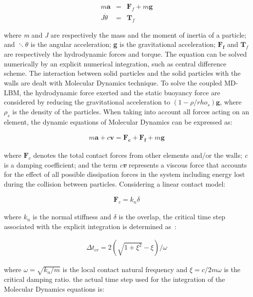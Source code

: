 \begin{align}
\mathit{m}\mathbf{ a} & = & \mathbf{F}_{f} + \mathit{m }\mathbf{g} \\
\mathit{J } \ddot{\theta} & = &  \mathbf{T}_{f}
\end{align}

where \textit{m} and \textit{J} are respectively the mass and the moment of 
inertia of a particle; and $\ddots{\theta}$ is the angular acceleration; 
\textbf{g} is the gravitational acceleration; $\mathbf{F_f}$ and 
$\mathbf{T}_{f}$ are respectively the hydrodynamic forces and torque. The 
equation can be solved numerically by an explicit numerical integration, such 
as central difference scheme. The interaction between solid particles and the 
solid particles with the walls are dealt with Molecular Dynamics technique. To 
solve the coupled MD-LBM, the hydrodynamic force exerted and the static 
buoyancy force are considered by reducing the gravitational acceleration to 
$(1- \rho/rho_{s})\mathbf{g}$, where $\rho_{s}$ is the density of the 
particles. When taking into account all forces acting on an element, the 
dynamic equations of Molecular Dynamics can be expressed as:

\begin{align}
\label{eq:mde}
\mathit{m}\mathbf{a} +\mathit{c}\mathbf{v} = \mathbf{F_c} + \mathbf{F_f} 
+\mathit{m}\mathbf{g}
\end{align} 

where $\mathbf{F}_{c}$ denotes the total contact forces from other elements 
and/or the walls; \textit{c} is a damping coefficient; and the term 
\textit{c\textbf{v}} represents a viscous force that accounts for the effect of 
all possible dissipation forces in the system including energy lost during the 
collision between particles. Considering a linear contact model:

\begin{align}
\mathbf{F}_{c}=\mathit{k}_{\mathit{n}} \delta
\end{align}

where $\mathit{k}_{\mathit{n}}$ is the normal stiffness and $\delta$ is the 
overlap, the critical time step associated with the explicit integration is 
determined as~\citep{He1997}:

\begin{align}
\Delta t_{\mathit{cr}}= 2(\sqrt{1 + \xi^{2}}-\xi) / \omega
\end{align}

where $\omega = \sqrt{\mathit{k}_{\mathit{n}}/\mathit{m}}$ is the local contact 
natural frequency and $\xi = \mathit{c}/2\mathit{m}\omega$ is the critical 
damping ratio. the actual time step used for the integration of the Molecular 
Dynamics equations is:

